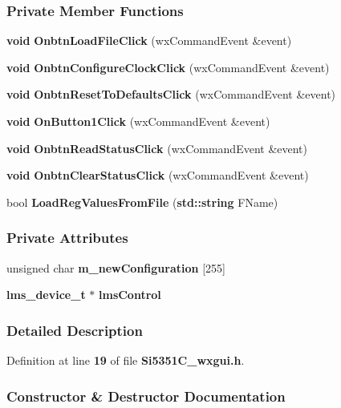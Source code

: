 \subsubsection*{Private Member Functions}
\begin{DoxyCompactItemize}
\item 
{\bf void} {\bf Onbtn\+Load\+File\+Click} (wx\+Command\+Event \&event)
\item 
{\bf void} {\bf Onbtn\+Configure\+Clock\+Click} (wx\+Command\+Event \&event)
\item 
{\bf void} {\bf Onbtn\+Reset\+To\+Defaults\+Click} (wx\+Command\+Event \&event)
\item 
{\bf void} {\bf On\+Button1\+Click} (wx\+Command\+Event \&event)
\item 
{\bf void} {\bf Onbtn\+Read\+Status\+Click} (wx\+Command\+Event \&event)
\item 
{\bf void} {\bf Onbtn\+Clear\+Status\+Click} (wx\+Command\+Event \&event)
\item 
bool {\bf Load\+Reg\+Values\+From\+File} ({\bf std\+::string} F\+Name)
\end{DoxyCompactItemize}
\subsubsection*{Private Attributes}
\begin{DoxyCompactItemize}
\item 
unsigned char {\bf m\+\_\+new\+Configuration} [255]
\item 
{\bf lms\+\_\+device\+\_\+t} $\ast$ {\bf lms\+Control}
\end{DoxyCompactItemize}


\subsubsection{Detailed Description}


Definition at line {\bf 19} of file {\bf Si5351\+C\+\_\+wxgui.\+h}.



\subsubsection{Constructor \& Destructor Documentation}
